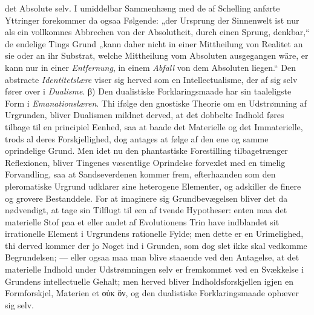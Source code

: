 \documentclass[12pt]{book}
\newcommand{\opage}[1]{\marginnote{\footnotesize\textit{[#1]}}}
\begin{document}
det Absolute selv. I umiddelbar Sammenhæng med de af Schelling anførte Yttringer forekommer da
ogsaa Følgende: „der Ursprung der Sinnenwelt ist nur als ein vollkomnes Abbrechen von der
Absolutheit, durch einen Sprung, denkbar,“ de endelige Tings Grund „kann daher nicht in einer
Mittheilung von Realitet an sie oder an ihr Substrat, welche Mittheilung vom Absoluten
ausgegangen wäre, er kann nur in einer \emph{Entfernung}, in einem \emph{Abfall} von dem
Absoluten liegen.“ Den abstracte \emph{Identitetslære} viser sig herved som en
Intellectualisme, der af sig selv fører over i \emph{Dualisme}. β) Den dualistiske
Forklaringsmaade har sin taaleligste Form i \emph{Emanationslæren}. Thi ifølge den gnostiske
Theorie om en Udstrømning af Urgrunden, bliver Dualismen mildnet derved, at det dobbelte Indhold
føres tilbage til en principiel Eenhed, saa at baade det Materielle og det Immaterielle, trods
al deres Forskjellighed, dog antages at følge af den ene og samme oprindelige Grund. Men idet nu
den phantastiske Forestilling tilbagetrænger Reflexionen, bliver Tingenes væsentlige Oprindelse
forvexlet med en timelig Forvandling, saa at Sandseverdenen kommer frem, efterhaanden
\opage{136} %
som den pleromatiske Urgrund udklarer sine heterogene Elementer, og adskiller de finere og
grovere Bestanddele. For at imaginere sig Grundbevægelsen bliver det da nødvendigt, at tage sin
Tilflugt til een af tvende Hypotheser: enten maa det materielle Stof paa et eller andet af
Evolutionens Trin have indblandet sit irrationelle Element i Urgrundens rationelle Fylde; men
dette er en Urimelighed, thi derved kommer der jo Noget ind i Grunden, som dog slet ikke skal
vedkomme Begrundelsen; --- eller ogsaa maa man blive staaende ved den Antagelse, at det
materielle Indhold under Udstrømningen selv er fremkommet ved en Svækkelse i Grundens
intellectuelle Gehalt; men herved bliver Indholdsforskjellen igjen en Formforskjel, Materien et
οὐκ ὄν, og den dualistiske Forklaringsmaade ophæver sig selv.
\end{document}

